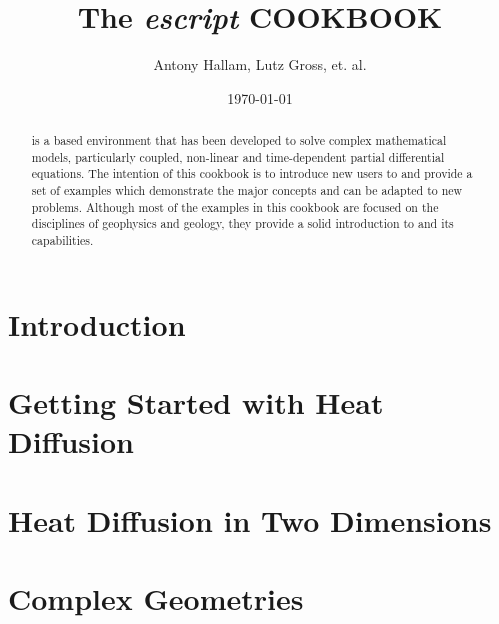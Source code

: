 \documentclass{esysdoc}
\title{The \textit{escript} COOKBOOK}
\author{Antony Hallam, Lutz Gross, et. al.}
\date{\today}
\begin{document}
\maketitle

\ifpdf
{}
\fi

%

\begin{abstract}
\esc is a \pyt based environment that has been developed to solve complex mathematical models, particularly coupled, non-linear and time-dependent partial differential equations. The intention of this cookbook is to introduce new users to \esc and provide a set of examples which demonstrate the major concepts and can be adapted to new problems. Although most of the examples in this cookbook are focused on the disciplines of geophysics and geology, they provide a solid introduction to \esc and its capabilities.
\end{abstract}
\etableofcontents

\newpage

\chapter{Introduction}
 \label{CHAP INTRO}
 
\chapter{Getting Started with Heat Diffusion}
 \label{CHAP HEAT DIFF}
% 
% 
\chapter{Heat Diffusion in Two Dimensions}
 \label{CHAP HEAT 2a}
 
\chapter{Complex Geometries}
 \label{CHAP HEAT 2}
 
 
\end{document}
